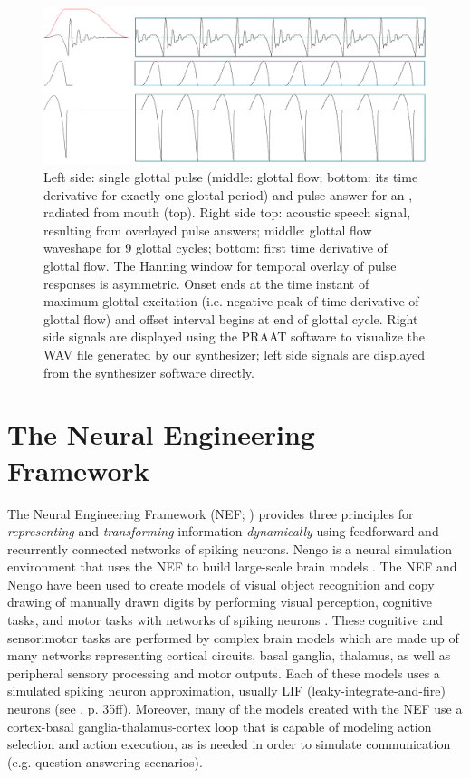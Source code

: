 \documentclass[conference]{IEEEtran}
\let\ipa\textipa
\begin{document}
\begin{figure}[!t]
  \includegraphics[width=\columnwidth]{signal1234}
  \caption{Left side: single glottal pulse (middle: glottal flow;
    bottom: its time derivative for exactly one glottal period) and
    pulse answer for an \ipa{[A]}, radiated from mouth (top). Right side
    top: acoustic speech signal, resulting from overlayed pulse
    answers; middle: glottal flow waveshape for 9 glottal cycles;
    bottom: first time derivative of glottal flow. The Hanning window
    for temporal overlay of pulse responses is asymmetric. Onset ends
    at the time instant of maximum glottal excitation (i.e. negative peak
    of time derivative of glottal flow) and offset interval begins at
    end of glottal cycle. Right side signals are displayed using
    the PRAAT software to visualize the WAV file generated by our
    synthesizer; left side signals are displayed from the synthesizer
    software directly.}
\label{fig:signal}
\end{figure}

\section{The Neural Engineering Framework}

The Neural Engineering Framework (NEF; \cite{eliasmith2003})
provides three principles for \textit{representing} and
\textit{transforming} information \textit{dynamically}
using feedforward and recurrently connected networks
of spiking neurons.
Nengo is a neural simulation environment that uses the NEF
to build large-scale brain models \cite{bekolay2014}.
The NEF and Nengo have been used to create models of visual
object recognition and copy drawing of manually drawn digits by
performing visual perception, cognitive tasks, and motor tasks
with networks of spiking neurons \cite{eliasmith2012,eliasmith2013}.
These cognitive and sensorimotor tasks are performed by
complex brain models which are made up of many networks representing
cortical circuits, basal ganglia, thalamus, as well as peripheral
sensory processing and motor outputs.
Each of these models uses a simulated spiking neuron approximation,
usually LIF (leaky-integrate-and-fire) neurons
(see \cite{eliasmith2013}, p. 35ff).
Moreover, many of the models created with the NEF
use a cortex-basal ganglia-thalamus-cortex loop
that is capable of modeling action
selection and action execution, as is needed in order to simulate
communication (e.g. question-answering scenarios).
\end{document}

